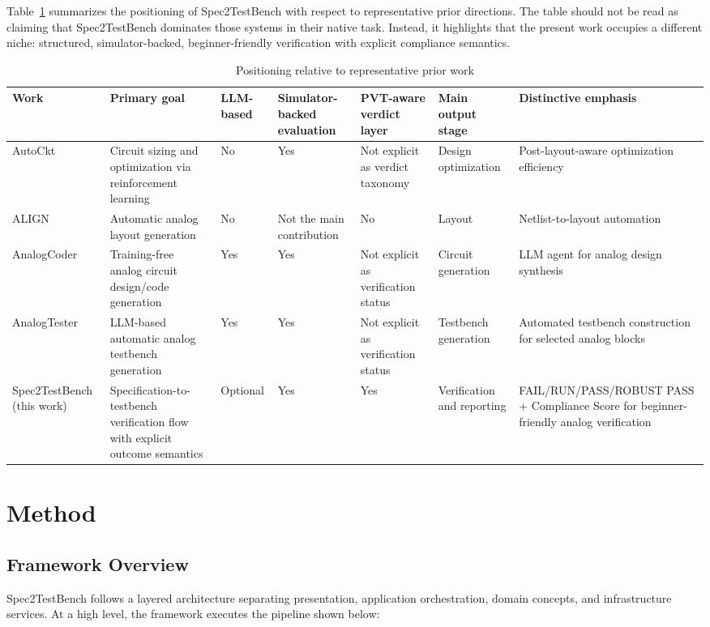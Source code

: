 \documentclass[conference]{IEEEtran}
\begin{document}
Table~\ref{tab:relatedwork} summarizes the positioning of Spec2TestBench with respect to representative prior directions. The table should not be read as claiming that Spec2TestBench dominates those systems in their native task. Instead, it highlights that the present work occupies a different niche: structured, simulator-backed, beginner-friendly verification with explicit compliance semantics.

\begin{table}[t]
\caption{Positioning relative to representative prior work}
\label{tab:relatedwork}
\centering
\scriptsize
\begin{tabular}{p{2.2cm}p{3.2cm}p{2.0cm}p{1.7cm}p{1.8cm}p{2.1cm}p{2.5cm}}
\toprule
Work & Primary goal & LLM-based & Simulator-backed evaluation & PVT-aware verdict layer & Main output stage & Distinctive emphasis \\
\midrule
AutoCkt \cite{settaluri2020autockt} & Circuit sizing and optimization via reinforcement learning & No & Yes & Not explicit as verdict taxonomy & Design optimization & Post-layout-aware optimization efficiency \\
ALIGN \cite{dhar2020align} & Automatic analog layout generation & No & Not the main contribution & No & Layout & Netlist-to-layout automation \\
AnalogCoder \cite{lai2024analogcoder} & Training-free analog circuit design/code generation & Yes & Yes & Not explicit as verification status & Circuit generation & LLM agent for analog design synthesis \\
AnalogTester \cite{chen2025analogtester} & LLM-based automatic analog testbench generation & Yes & Yes & Not explicit as verification status & Testbench generation & Automated testbench construction for selected analog blocks \\
Spec2TestBench (this work) & Specification-to-testbench verification flow with explicit outcome semantics & Optional & Yes & Yes & Verification and reporting & FAIL/RUN/PASS/ROBUST PASS + Compliance Score for beginner-friendly analog verification \\
\bottomrule
\end{tabular}
\end{table}

\section{Method}
\subsection{Framework Overview}
Spec2TestBench follows a layered architecture separating presentation, application orchestration, domain concepts, and infrastructure services. At a high level, the framework executes the pipeline shown below:
\end{document}

